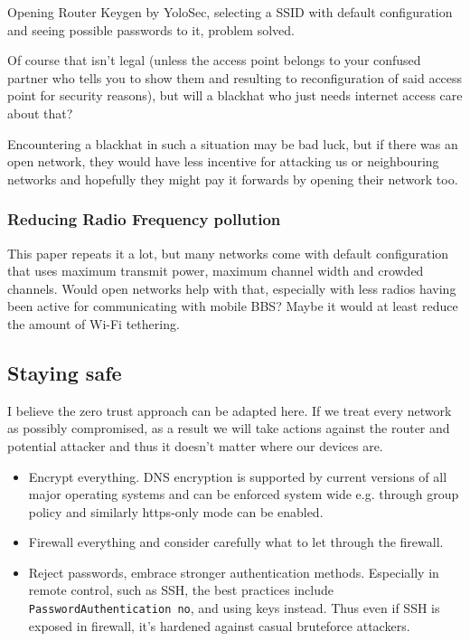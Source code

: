 \documentclass[../wifi-security.tex]{subfiles}
\begin{document}
Opening Router Keygen by YoloSec, selecting a SSID with default configuration and seeing possible passwords to it, problem solved.

Of course that isn't legal (unless the access point belongs to your confused partner who tells you to show them and resulting to reconfiguration of said access point for security reasons), but will a blackhat who just needs internet access care about that?

Encountering a blackhat in such a situation may be bad luck, but if there was an open network, they would have less incentive for attacking us or neighbouring networks and hopefully they might pay it forwards by opening their network too.


\subsubsection{Reducing Radio Frequency pollution}

This paper repeats it a lot, but many networks come with default configuration that uses maximum transmit power, maximum channel width and crowded channels. Would open networks help with that, especially with less radios having been active for communicating with mobile BBS? Maybe it would at least reduce the amount of Wi-Fi tethering.


\subsection{Staying safe}

I believe the zero trust approach can be adapted here. If we treat every network as possibly compromised, as a result we will take actions against the router and potential attacker and thus it doesn't matter where our devices are.

\begin{itemize}
\item Encrypt everything. DNS encryption is supported by current versions of all major operating systems and can be enforced system wide e.g. through group policy and similarly https-only mode can be enabled. %
\item Firewall everything and consider carefully what to let through the firewall.
\item Reject passwords, embrace stronger authentication methods. Especially in remote control, such as SSH, the best practices include \texttt{PasswordAuthentication no}, and using keys instead. Thus even if SSH is exposed in firewall, it's hardened against casual bruteforce attackers.
\end{itemize}

\end{document}
